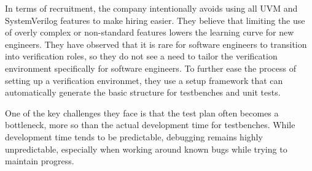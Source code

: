\documentclass[12pt]{book}
\begin{document}
In terms of recruitment, the company intentionally avoids using all UVM and SystemVerilog features to make hiring easier. They believe that limiting the use of overly complex or non-standard features lowers the learning curve for new engineers. They have observed that it is rare for software engineers to transition into verification roles, so they do not see a need to tailor the verification environment specifically for software engineers. To further ease the process of setting up a verification environmet, they use a setup framework that can automatically generate the basic structure for testbenches and unit tests.

One of the key challenges they face is that the test plan often becomes a bottleneck, more so than the actual development time for testbenches. While development time tends to be predictable, debugging remains highly unpredictable, especially when working around known bugs while trying to maintain progress.
\end{document}

